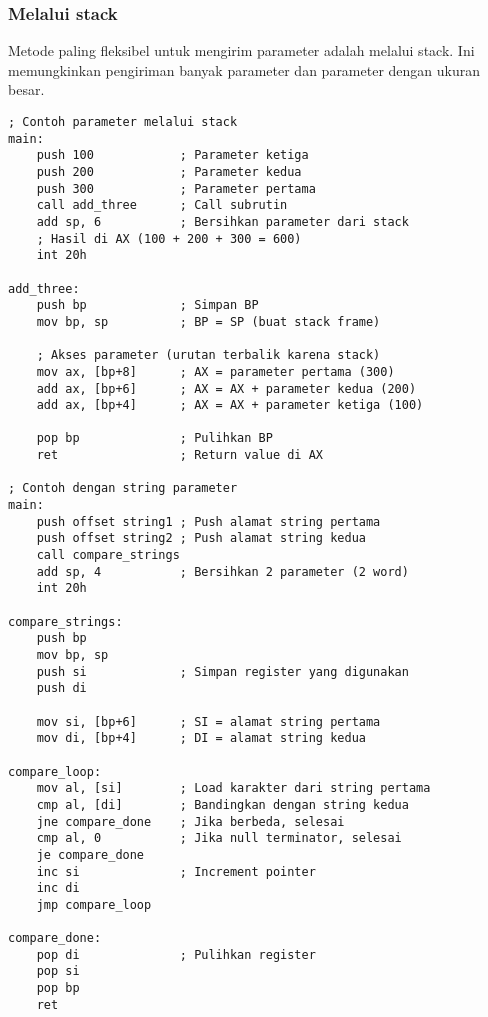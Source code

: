 \documentclass[../main.tex]{subfiles}
\begin{document}
            \subsubsection{Melalui stack}
                Metode paling fleksibel untuk mengirim parameter adalah melalui stack. Ini memungkinkan pengiriman banyak parameter dan parameter dengan ukuran besar.

                \begin{lstlisting}[language={[x86masm]Assembler}, caption=Parameter melalui Stack, label={lst:param-stack}]
; Contoh parameter melalui stack
main:
    push 100            ; Parameter ketiga
    push 200            ; Parameter kedua  
    push 300            ; Parameter pertama
    call add_three      ; Call subrutin
    add sp, 6           ; Bersihkan parameter dari stack
    ; Hasil di AX (100 + 200 + 300 = 600)
    int 20h

add_three:
    push bp             ; Simpan BP
    mov bp, sp          ; BP = SP (buat stack frame)
    
    ; Akses parameter (urutan terbalik karena stack)
    mov ax, [bp+8]      ; AX = parameter pertama (300)
    add ax, [bp+6]      ; AX = AX + parameter kedua (200)
    add ax, [bp+4]      ; AX = AX + parameter ketiga (100)
    
    pop bp              ; Pulihkan BP
    ret                 ; Return value di AX

; Contoh dengan string parameter
main:
    push offset string1 ; Push alamat string pertama
    push offset string2 ; Push alamat string kedua
    call compare_strings
    add sp, 4           ; Bersihkan 2 parameter (2 word)
    int 20h

compare_strings:
    push bp
    mov bp, sp
    push si             ; Simpan register yang digunakan
    push di
    
    mov si, [bp+6]      ; SI = alamat string pertama
    mov di, [bp+4]      ; DI = alamat string kedua
    
compare_loop:
    mov al, [si]        ; Load karakter dari string pertama
    cmp al, [di]        ; Bandingkan dengan string kedua
    jne compare_done    ; Jika berbeda, selesai
    cmp al, 0           ; Jika null terminator, selesai
    je compare_done
    inc si              ; Increment pointer
    inc di
    jmp compare_loop
    
compare_done:
    pop di              ; Pulihkan register
    pop si
    pop bp
    ret
                \end{lstlisting}
\end{document}
